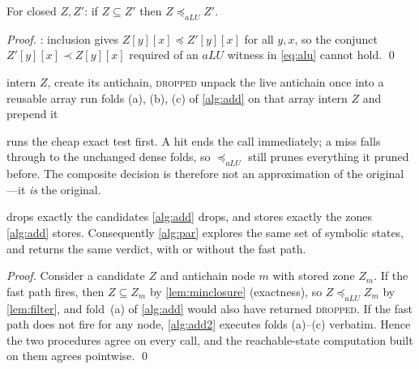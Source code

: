 \begin{lemma}\label{lem:filter}
For closed $Z, Z'$: if $Z \subseteq Z'$ then $Z \preceq_{aLU} Z'$.
\end{lemma}
\begin{proof}
: inclusion gives $Z[y][x] \preceq Z'[y][x]$ for all
$y,x$, so the conjunct $Z'[y][x] \prec Z[y][x]$ required of an $aLU$ witness in
\cref{eq:alu} cannot hold. \qed
\end{proof}

\begin{algorithm}[t]
\caption{$\mathrm{add}(q,Z,k)$ --- with the compressed-form fast path}
\label{alg:add2}
\begin{algorithmic}[1]
 intern $Z$, create its antichain, \Return \EndIf
{}
      \Return \textsc{dropped}
  \EndIf
\EndFor
\State unpack the live antichain once into a reusable array
\State run folds (a), (b), (c) of \cref{alg:add} on that array
\State intern $Z$ and prepend it
\end{algorithmic}
\end{algorithm}

 runs the cheap exact test first.  A hit ends the call
immediately; a miss falls through to the unchanged dense folds, so
$\preceq_{aLU}$ still prunes everything it pruned before.  The composite decision
is therefore not an approximation of the original---it \emph{is} the original.

\begin{theorem}\label{thm:samestates}
 drops exactly the candidates \cref{alg:add} drops, and stores
exactly the zones \cref{alg:add} stores.  Consequently \cref{alg:par} explores
the same set of symbolic states, and returns the same verdict, with or without
the fast path.
\end{theorem}
\begin{proof}
Consider a candidate $Z$ and antichain node $m$ with stored zone $Z_m$.  If the
fast path fires, then $Z \subseteq Z_m$ by \cref{lem:minclosure} (exactness), so
$Z \preceq_{aLU} Z_m$ by \cref{lem:filter}, and fold~(a) of \cref{alg:add} would
also have returned \textsc{dropped}.  If the fast path does not fire for any
node, \cref{alg:add2} executes folds (a)--(c) verbatim.  Hence the two
procedures agree on every call, and the reachable-state computation built on
them agrees pointwise. \qed
\end{proof}


